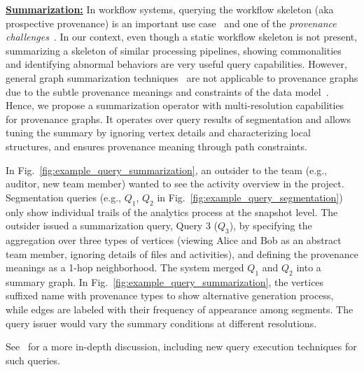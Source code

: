 \documentclass[11pt]{article}
\newcommand{\eat}[1]{}
\newcommand{\topic}[1]{\vspace{3pt}\noindent\underline{\bf #1}}
\begin{document}
\topic{Summarization:} In workflow systems, querying the workflow skeleton (aka prospective provenance) is an important use case~\cite{bpql_milo@vldb06} and one of the {\em provenance challenges}~\cite{prov_challenges@website}. In our context, even though a static workflow skeleton is not present, summarizing a skeleton of similar processing pipelines, showing commonalities and identifying abnormal behaviors are very useful query capabilities. However, general graph summarization techniques~\cite{summary_tutorial@pvldb17} are not applicable to provenance graphs due to the subtle provenance meanings and constraints of the data model~\cite{prov_dm@w3c_tr13,provabs_pmissier@ipaw14,agg_lucmoreau@gam15}. 
Hence, we propose a summarization operator with multi-resolution capabilities for provenance graphs. 
It operates over query results of segmentation and allows tuning the summary by ignoring vertex details and characterizing local structures, and ensures provenance meaning through path constraints.


\vspace{-3pt}
\begin{example}
\label{exp:sumop_q3}
In Fig.~\ref{fig:example_query_summarization}, an outsider to the team (e.g., auditor, new team member) wanted to see the activity overview in the project. Segmentation queries (e.g., $Q_1$, $Q_2$ in Fig.~\ref{fig:example_query_segmentation}) only show individual trails of the analytics process at the snapshot level. The outsider issued a summarization query, Query 3 ($Q_3$), by specifying the aggregation over three types of vertices (viewing Alice and Bob as an abstract team member, ignoring details of files and activities), and defining the provenance meanings as a 1-hop neighborhood. The system merged $Q_1$ and $Q_2$ into a summary graph\eat{according to the query}. In Fig.~\ref{fig:example_query_summarization}, the vertices suffixed name with provenance types to show alternative generation process, while edges are labeled with their frequency of appearance among segments. The query issuer would vary the summary conditions at different resolutions.
\end{example}

\noindent
See~\cite{provquery_long} for a more in-depth discussion, including new query execution techniques for such queries.
\end{document}
